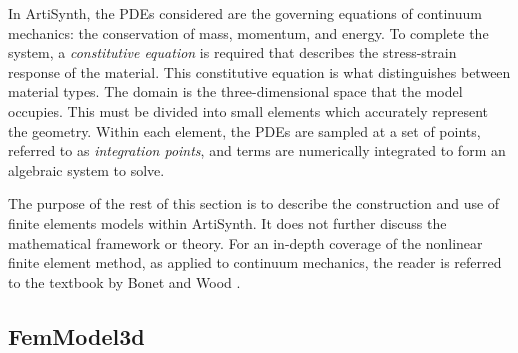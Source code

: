 In ArtiSynth, the PDEs considered are the governing equations of
continuum mechanics: the conservation of mass, momentum, and energy.  To 
complete the system, a \emph{constitutive equation} is required that describes
the stress-strain response of the material.  This constitutive equation is what
distinguishes between material types.  The domain is the three-dimensional space
that the model occupies. This must be divided into small elements which 
accurately represent the geometry. Within each element, the PDEs are
sampled at a set of points, referred to as \emph{integration points}, and 
terms are numerically integrated to form an algebraic system to solve.

The purpose of the rest of this section is to describe the construction and
use of finite elements models within ArtiSynth.  It does not further discuss 
the mathematical framework or theory.
For an in-depth coverage of the nonlinear finite element method, as applied
to continuum mechanics, the reader is referred to the textbook by Bonet and 
Wood \cite{bonet:fem:2000}.

\subsection{FemModel3d}
\label{sec:fem:structure}

